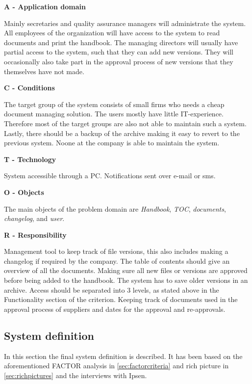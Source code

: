 \textbf{A - Application domain}

Mainly secretaries and quality assurance managers will administrate the system.
All employees of the organization will have access to the system to read documents and print the handbook.
The managing directors will usually have partial access to the system, such that they can add new versions.
They will occasionally also take part in the approval process of new versions that they themselves have not made.

\textbf{C - Conditions}

The target group of the system consists of small firms who needs a cheap document managing solution.
The users mostly have little IT-experience.
Therefore most of the target groups are also not able to maintain such a system.
Lastly, there should be a backup of the archive making it easy to revert to the previous system.
Noone at the company is able to maintain the system.

\textbf{T - Technology}

System accessible through a PC.
Notifications sent over e-mail or sms.

\textbf{O - Objects}

The main objects of the problem domain are \textit{Handbook}, \textit{TOC}, \textit{documents}, \textit{changelog}, and \textit{user}.


\textbf{R  - Responsibility}

Management tool to keep track of file versions, this also includes making a changelog if required by the company.
The table of contents should give an overview of all the documents.
Making sure all new files or versions are approved before being added to the handbook.
The system has to save older versions in an archive.
Access should be separated into 3 levels, as stated above in the Functionality section of the criterion.
Keeping track of documents used in the approval process of suppliers and dates for the approval and re-approvals.

\subsection{System definition}\label{sec:systemdefinition}
In this section the final system definition is described.
It has been based on the aforementioned FACTOR analysis in \cref{sec:factorcriteria} and rich picture in \cref{sec:richpictures} and the interviews with Ipsen.

